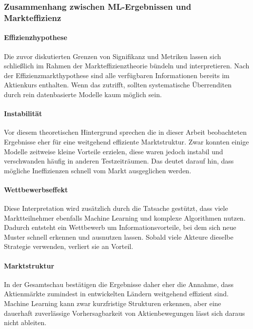 \subsubsection{Zusammenhang zwischen ML-Ergebnissen und Markteffizienz}
\paragraph{Effizienzhypothese}
Die zuvor diskutierten Grenzen von Signifikanz und Metriken lassen sich schließlich im Rahmen der Markteffizienztheorie bündeln und interpretieren. Nach der Effizienzmarkthypothese sind alle verfügbaren Informationen bereits im Aktienkurs enthalten. Wenn das zutrifft, sollten systematische Überrenditen durch rein datenbasierte Modelle kaum möglich sein.
\paragraph{Instabilität}
Vor diesem theoretischen Hintergrund sprechen die in dieser Arbeit beobachteten Ergebnisse eher für eine weitgehend effiziente Marktstruktur. Zwar konnten einige Modelle zeitweise kleine Vorteile erzielen, diese waren jedoch instabil und verschwanden häufig in anderen Testzeiträumen. Das deutet darauf hin, dass mögliche Ineffizienzen schnell vom Markt ausgeglichen werden.
\paragraph{Wettbewerbseffekt}
Diese Interpretation wird zusätzlich durch die Tatsache gestützt, dass viele Marktteilnehmer ebenfalls Machine Learning und komplexe Algorithmen nutzen. Dadurch entsteht ein Wettbewerb um Informationsvorteile, bei dem sich neue Muster schnell erkennen und ausnutzen lassen. Sobald viele Akteure dieselbe Strategie verwenden, verliert sie an Vorteil.
\paragraph{Marktstruktur}
In der Gesamtschau bestätigen die Ergebnisse daher eher die Annahme, dass Aktienmärkte zumindest in entwickelten Ländern weitgehend effizient sind. Machine Learning kann zwar kurzfristige Strukturen erkennen, aber eine dauerhaft zuverlässige Vorhersagbarkeit von Aktienbewegungen lässt sich daraus nicht ableiten.
